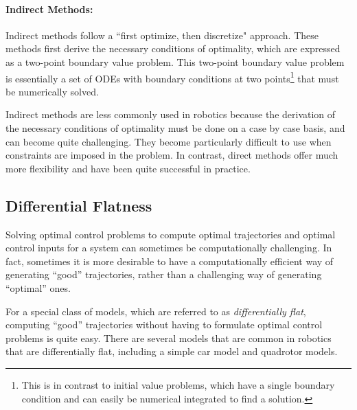 \paragraph{Indirect Methods:}
Indirect methods follow a ``first optimize, then discretize" approach. These methods first derive the necessary conditions of optimality, which are expressed as a two-point boundary value problem. This two-point boundary value problem is essentially a set of ODEs with boundary conditions at two points\footnote{This is in contrast to initial value problems, which have a single boundary condition and can easily be numerical integrated to find a solution.} that must be numerically solved.

\vspace{\baselineskip}
Indirect methods are less commonly used in robotics because the derivation of the necessary conditions of optimality must be done on a case by case basis, and can become quite challenging. They become particularly difficult to use when constraints are imposed in the problem. In contrast, direct methods offer much more flexibility and have been quite successful in practice.

\subsection{Differential Flatness}
Solving optimal control problems to compute optimal trajectories and optimal control inputs for a system can sometimes be computationally challenging. In fact, sometimes it is more desirable to have a computationally efficient way of generating ``good'' trajectories, rather than a challenging way of generating ``optimal'' ones.

For a special class of models, which are referred to as \textit{differentially flat}, computing ``good'' trajectories without having to formulate optimal control problems is quite easy. There are several models that are common in robotics that are differentially flat, including a simple car model and quadrotor models.

